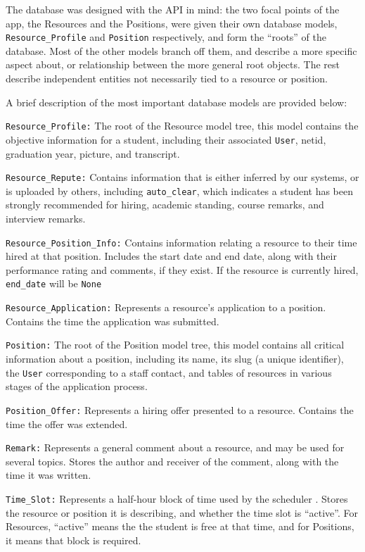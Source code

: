 The database was designed with the API in mind: the two focal points of the app, the Resources and the Positions, were given their own database models, \texttt{Resource\_Profile} and \texttt{Position} respectively, and form the ``roots'' of the database. Most of the other models branch off them, and describe a more specific aspect about, or relationship between the more general root objects. The rest describe independent entities not necessarily tied to a resource or position.

A brief description of the most important database models are provided below:
\bullist
    \item \texttt{Resource\_Profile:} The root of the Resource model tree, this model contains the objective information for a student, including their associated \texttt{User}, netid, graduation year, picture, and transcript.
    \item \texttt{Resource\_Repute:} Contains information that is either inferred by our systems, or is uploaded by others, including \texttt{auto\_clear}, which indicates a student has been strongly recommended for hiring, academic standing, course remarks, and interview remarks.
    \item \texttt{Resource\_Position\_Info:} Contains information relating a resource to their time hired at that position. Includes the start date and end date, along with their performance rating and comments, if they exist. If the resource is currently hired, \texttt{end\_date} will be \texttt{None}
    \item \texttt{Resource\_Application:} Represents a resource's application to a position. Contains the time the application was submitted.
    \item \texttt{Position:} The root of the Position model tree, this model contains all critical information about a position, including its name, its slug (a unique identifier), the \texttt{User} corresponding to a staff contact, and tables of resources in various stages of the application process.
    \item \texttt{Position\_Offer:} Represents a hiring offer presented to a resource. Contains the time the offer was extended.
    \item \texttt{Remark:} Represents a general comment about a resource, and may be used for several topics. Stores the author and receiver of the comment, along with the time it was written.
    \item \texttt{Time\_Slot:} Represents a half-hour block of time used by the scheduler . Stores the resource or position it is describing, and whether the time slot is ``active''. For Resources, ``active'' means the the student is free at that time, and for Positions, it means that block is required.
\finbullist

